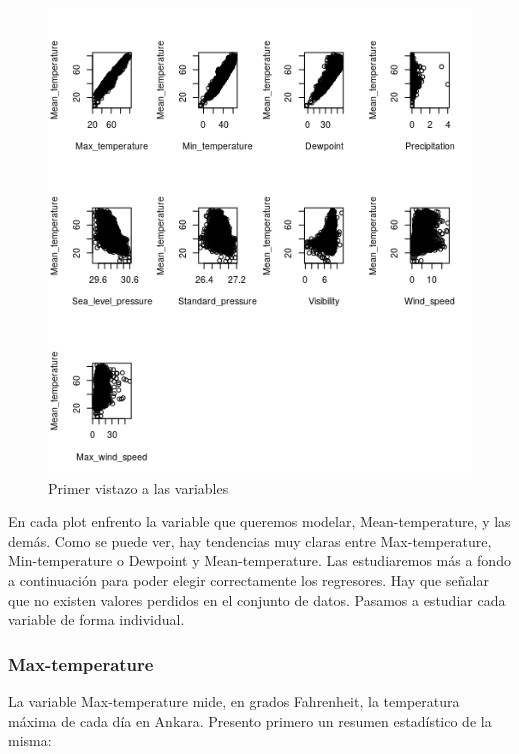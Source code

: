\begin{figure}[H] %
	\centering
	\includegraphics[scale=0.7]{primer-vistazo-wankara.png}  %
	\caption{Primer vistazo a las variables} 
	\label{fig:pvwankara}
\end{figure}

En cada plot enfrento la variable que queremos modelar, Mean-temperature, y las demás. Como se puede ver, hay tendencias muy claras entre Max-temperature, Min-temperature o Dewpoint y Mean-temperature. Las estudiaremos más a fondo a continuación para poder elegir correctamente los regresores. Hay que señalar que no existen valores perdidos en el conjunto de datos. Pasamos a estudiar cada variable de forma individual.


\subsubsection{Max-temperature}

La variable Max-temperature mide, en grados Fahrenheit, la temperatura máxima de cada día en Ankara. Presento primero un resumen estadístico de la misma:

